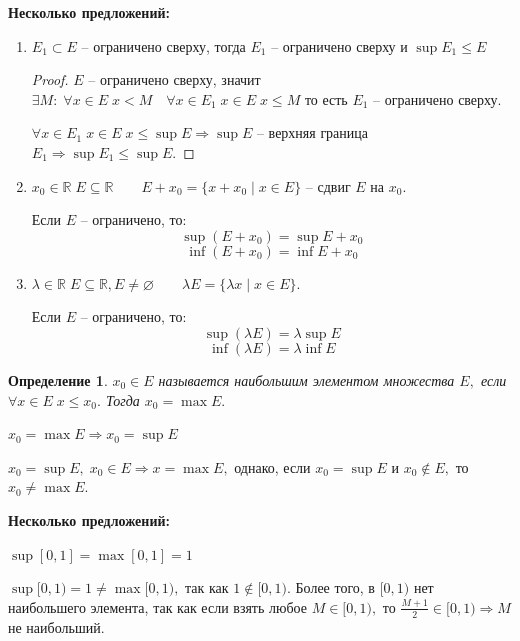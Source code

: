 \documentclass{article}
\newtheorem{Definition}{Определение}[section]
\begin{document}
\newpage
\par\medskip \textbf{Несколько предложений:}\par
\begin{enumerate}
\item $E_1\subset E$ -- ограничено сверху, тогда $E_1$ -- ограничено сверху и $\sup E_1\leq E$
\begin{proof}
$E$ -- ограничено сверху, значит $\exists M: \; \forall x\in E \; x<M \quad \forall x\in E_1 \; x\in E\; x\leq M$ то есть $E_1$ -- ограничено сверху.
\par $\forall x\in E_1\; x\in E \; x\leq \sup E \Rightarrow \sup E$ -- верхняя граница $E_1 \Rightarrow \sup E_1\leq \sup E.$
\end{proof}
\item $x_0\in\mathbb{R} \; E\subseteq\mathbb{R} \qquad E+x_0=\{x+x_0\mid x\in E\}$ -- сдвиг $E$ на $x_0.$
\par Если $E$ -- ограничено, то:
$$\sup\left(E+x_0\right)=\sup E+x_0$$
$$\inf\left(E+x_0\right)=\inf E+x_0$$
\item $\lambda\in\mathbb{R} \; E\subseteq\mathbb{R}, E\neq\varnothing \qquad \lambda E=\{\lambda x\mid x\in E\}.$
\par Если $E$ -- ограничено, то:
$$\sup\left(\lambda E\right)=\lambda\sup E$$
$$\inf\left(\lambda E\right)=\lambda\inf E$$
\end{enumerate}

\begin{Definition}
$x_0\in E$ называется наибольшим элементом множества $E,$ если $\forall x\in E\; x\leq x_0.$ Тогда $x_0=\max E.$
\end{Definition}

\par $x_0=\max E\Rightarrow x_0=\sup E$
\par $x_0=\sup E,\; x_0\in E \Rightarrow x=\max E,$ однако, если $x_0=\sup E$ и $x_0\notin E,$ то $x_0\neq\max E.$

\par\medskip \textbf{Несколько предложений:}\par
$\sup[0, 1] = \max[0, 1] = 1$
\par $\sup[0, 1) = 1 \neq \max[0, 1),$ так как $1\notin[0, 1).$ Более того, в $[0, 1)$ нет наибольшего элемента, так как если взять любое $M\in[0, 1),$ то $\frac{M+1}{2}\in[0, 1) \Rightarrow M$ не наибольший.
\end{document}
